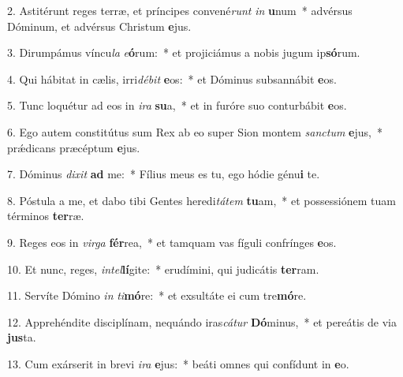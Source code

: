 2. Astitérunt reges terræ, et príncipes convené\textit{runt} \textit{in} \textbf{u}num~*  advérsus Dóminum, et advérsus Christum \textbf{e}jus.\

3. Dirumpámus víncu\textit{la} \textit{e}\textbf{ó}rum:~*  et projiciámus a nobis jugum ip\textbf{só}rum.\

4. Qui hábitat in cælis, irri\textit{dé}\textit{bit} \textbf{e}os:~*  et Dóminus subsannábit \textbf{e}os.\

5. Tunc loquétur ad eos in \textit{i}\textit{ra} \textbf{su}a,~*  et in furóre suo conturbábit \textbf{e}os.\

6. Ego autem constitútus sum Rex ab eo super Sion montem \textit{sanc}\textit{tum} \textbf{e}jus,~*  prǽdicans præcéptum \textbf{e}jus.\

7. Dóminus \textit{di}\textit{xit} \textbf{ad} me:~*  Fílius meus es tu, ego hódie génu\textbf{i} te.\

8. Póstula a me, et dabo tibi Gentes heredi\textit{tá}\textit{tem} \textbf{tu}am,~*  et possessiónem tuam términos \textbf{ter}ræ.\

9. Reges eos in \textit{vir}\textit{ga} \textbf{fér}rea,~*  et tamquam vas fíguli confrínges \textbf{e}os.\

10. Et nunc, reges, \textit{in}\textit{tel}\textbf{lí}gite:~*  erudímini, qui judicátis \textbf{ter}ram.\

11. Servíte Dómino \textit{in} \textit{ti}\textbf{mó}re:~*  et exsultáte ei cum tre\textbf{mó}re.\

12. Apprehéndite disciplínam, nequándo iras\textit{cá}\textit{tur} \textbf{Dó}minus,~*  et pereátis de via \textbf{jus}ta.\

13. Cum exárserit in brevi \textit{i}\textit{ra} \textbf{e}jus:~*  beáti omnes qui confídunt in \textbf{e}o.\

